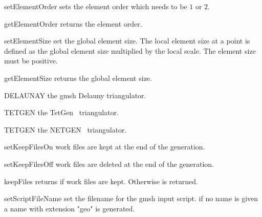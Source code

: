 \begin{methoddesc}[Design]{setElementOrder}{}
sets the element order which needs to be $1$ or $2$.
\end{methoddesc}

\begin{methoddesc}[Design]{getElementOrder}{}
returns the element order.
\end{methoddesc}


\begin{methoddesc}[Design]{setElementSize}{}
set the global element size. The local element size at a point is defined as 
the global element size multiplied by the local scale. The element size must be positive.
\end{methoddesc}


\begin{methoddesc}[Design]{getElementSize}{}
returns the global element size.
\end{methoddesc}

\begin{memberdesc}[Design]{DELAUNAY}
the gmsh Delauny triangulator.
\end{memberdesc}

\begin{memberdesc}[Design]{TETGEN}
the TetGen~\cite{TETGEN} triangulator.
\end{memberdesc}

\begin{memberdesc}[Design]{TETGEN}
the NETGEN~\cite{NETGEN} triangulator.
\end{memberdesc}

\begin{methoddesc}[Design]{setKeepFilesOn}{}
work files are kept at the end of the generation.
\end{methoddesc}

\begin{methoddesc}[Design]{setKeepFilesOff}{}
work files are deleted at the end of the generation.
\end{methoddesc}

\begin{methoddesc}[Design]{keepFiles}{}
returns \True if work files are kept. Otherwise \False is returned.
\end{methoddesc}

\begin{methoddesc}[Design]{setScriptFileName}{}
set the filename for the gmsh input script. if no name is given a name with extension "geo" is generated.
\end{methoddesc}

